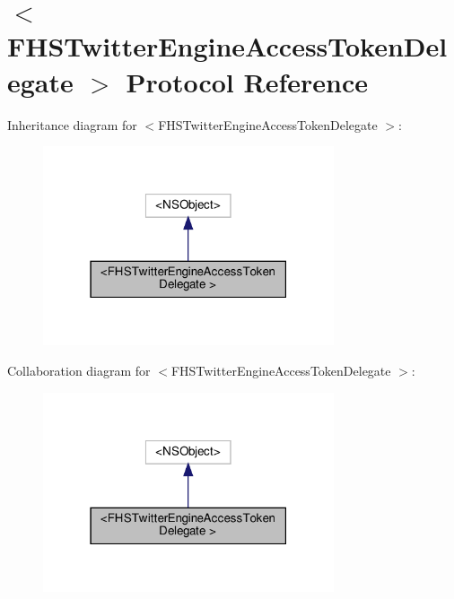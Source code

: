 \hypertarget{protocolFHSTwitterEngineAccessTokenDelegate_01-p}{}\section{$<$F\+H\+S\+Twitter\+Engine\+Access\+Token\+Delegate $>$ Protocol Reference}
\label{protocolFHSTwitterEngineAccessTokenDelegate_01-p}


Inheritance diagram for $<$F\+H\+S\+Twitter\+Engine\+Access\+Token\+Delegate $>$\+:
\nopagebreak
\begin{figure}[H]
\begin{center}
\leavevmode
\includegraphics[width=243pt]{protocolFHSTwitterEngineAccessTokenDelegate_01-p__inherit__graph}
\end{center}
\end{figure}


Collaboration diagram for $<$F\+H\+S\+Twitter\+Engine\+Access\+Token\+Delegate $>$\+:
\nopagebreak
\begin{figure}[H]
\begin{center}
\leavevmode
\includegraphics[width=243pt]{protocolFHSTwitterEngineAccessTokenDelegate_01-p__coll__graph}
\end{center}
\end{figure}
